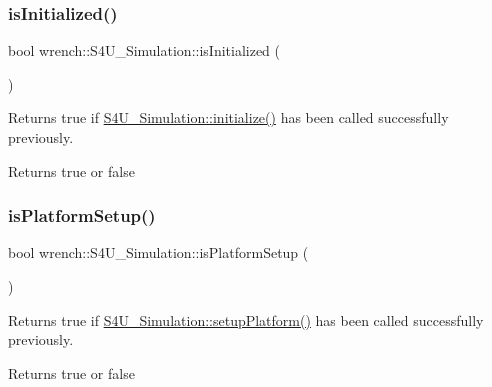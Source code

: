 \subsubsection{\texorpdfstring{is\+Initialized()}{isInitialized()}}
{\footnotesize\ttfamily bool wrench\+::\+S4\+U\+\_\+\+Simulation\+::is\+Initialized (\begin{DoxyParamCaption}{ }\end{DoxyParamCaption})}



Returns true if \hyperlink{classwrench_1_1_s4_u___simulation_a70b123a78f90e8e1f432111c3ce93929}{S4\+U\+\_\+\+Simulation\+::initialize()} has been called successfully previously. 

\begin{DoxyReturn}{Returns}
true or false 
\end{DoxyReturn}
\mbox{\label{classwrench_1_1_s4_u___simulation_a43730166b317647c4af355ebce2de5fc}} 
\subsubsection{\texorpdfstring{is\+Platform\+Setup()}{isPlatformSetup()}}
{\footnotesize\ttfamily bool wrench\+::\+S4\+U\+\_\+\+Simulation\+::is\+Platform\+Setup (\begin{DoxyParamCaption}{ }\end{DoxyParamCaption})}



Returns true if \hyperlink{classwrench_1_1_s4_u___simulation_a787dce31d634da739172a9f0fb0e8e30}{S4\+U\+\_\+\+Simulation\+::setup\+Platform()} has been called successfully previously. 

\begin{DoxyReturn}{Returns}
true or false 
\end{DoxyReturn}
\mbox{\label{classwrench_1_1_s4_u___simulation_a7658128602b3a342bc0daecff9459f36}} 
